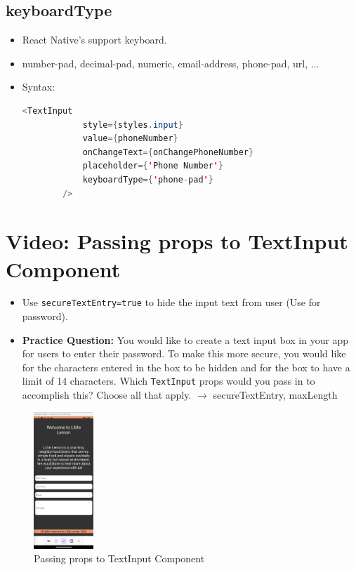 \subsection{keyboardType}
\begin{itemize}
    \item React Native's support keyboard.
    \item number-pad, decimal-pad, numeric, email-address, phone-pad, url, ...
    \item Syntax:
    \begin{lstlisting}[language=Java, numbers=none]
        <TextInput 
            style={styles.input} 
            value={phoneNumber} 
            onChangeText={onChangePhoneNumber} 
            placeholder={'Phone Number'} 
            keyboardType={'phone-pad'} 
        />
    \end{lstlisting} 
\end{itemize}

\section{Video: Passing props to TextInput Component}
\begin{itemize}
    \item Use \texttt{secureTextEntry={true}} to hide the input text from user (Use for password).
    \item \textbf{Practice Question:} You would like to create a text input box in your app for users to enter their password. To make this more secure, you would like for the characters entered in the box to be hidden and for the box to have a limit of 14 characters. Which \texttt{TextInput} props would you pass in to accomplish this? Choose all that apply.   
    $\rightarrow$ secureTextEntry, maxLength
\end{itemize}

\begin{figure}[H]
    \centering
    \includegraphics[width=0.2\textwidth]{images/passing-props.png}
    \caption{Passing props to TextInput Component}
\end{figure}


